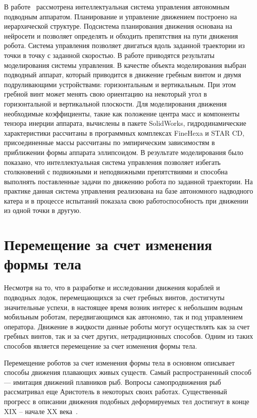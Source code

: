 В работе~\cite{Pshihopov_2014} рассмотрена интеллектуальная система управления автономным подводным аппаратом. Планирование и управление движением построено на иерархической структуре. Подсистема планирования движения основана на нейросети и позволяет определять и обходить препятствия на пути движения робота. Система управления позволяет двигаться вдоль заданной траектории из точки в точку с заданной скоростью. В работе приводятся результаты моделирования системы управления. В качестве объекта моделирования выбран подводный аппарат, который приводится в движение гребным винтом и двумя подруливающими устройствами: горизонтальным и вертикальным. При этом гребной винт может менять свою ориентацию на некоторый угол в горизонтальной и вертикальной плоскости. Для моделирования движения необходимые коэффициенты, такие как положение центра масс и компоненты тензора инерции аппарата, вычислены в пакете SolidWorks, гидродинамические характеристики рассчитаны в программных комплексах FineHexa и STAR CD, присоединенные массы рассчитаны по эмпирическим зависимостям в приближении формы аппарата эллипсоидом. В результате моделирования было показано, что интеллектуальная система управления позволяет избегать столкновений с подвижными и неподвижными препятствиями и способна выполнять поставленные задачи по движению робота по заданной траектории. На практике данная система управления реализована на базе автономного надводного катера и в процессе испытаний показала свою работоспособность при движении из одной точки в другую.



\section{Перемещение за счет изменения формы тела}\label{sec:ch1/sec3}

Несмотря на то, что в разработке и исследовании движения кораблей и подводных лодок, перемещающихся за счет гребных винтов, достигнуты значительные успехи, в настоящее время возник интерес к небольшим водным мобильным роботам, передвигающимся как автономно, так и под управлением оператора. Движение в жидкости данные роботы могут осуществлять как за счет гребных винтов, так и за счет других, нетрадиционных способов. Одним из таких способов является перемещение за счет изменения формы тела.

Перемещение роботов за счет изменения формы тела в основном описывает способы движения плавающих живых существ. Самый распространенный способ --- имитация движений плавников рыб. Вопросы самопродвижения рыб рассматривал еще Аристотель в некоторых своих работах. Существенный прогресс в описании движения подобных деформируемых тел достигнут в конце XIX -- начале XX века~\cite{Alexander_1983}. 

